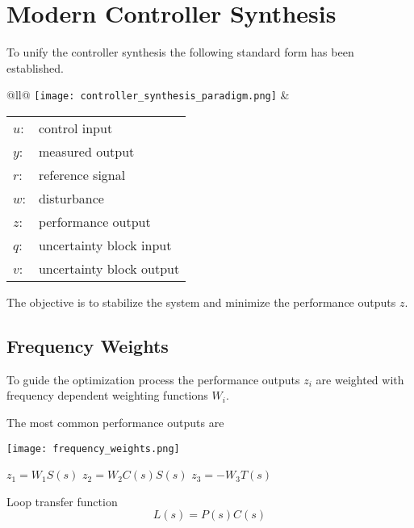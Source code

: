 \section{Modern Controller Synthesis}
To unify the controller synthesis the following standard form has been established.


\setlength{\oldtabcolsep}{\tabcolsep}\setlength\tabcolsep{2pt}

\begin{tabularx}{\linewidth}{@{}ll@{}}
    \texttt{[image: controller\_synthesis\_paradigm.png]}
     &
    {\begin{tabularx}{\linewidth}{@{}ll@{}}
                 $u$: & control input            \\
                 $y$: & measured output          \\
                 $r$: & reference signal         \\
                 $w$: & disturbance              \\
                 $z$: & performance output       \\
                 $q$: & uncertainty block input  \\
                 $v$: & uncertainty block output
             \end{tabularx}
        }
\end{tabularx}

\setlength{\tabcolsep}{\oldtabcolsep}


\newpar{}
The objective is to stabilize the system and minimize the performance outputs $z$.

\subsection{Frequency Weights}

To guide the optimization process the performance outputs $z_i$ are weighted with frequency dependent weighting functions $W_i$.

The most common performance outputs are
\begin{center}
    \texttt{[image: frequency\_weights.png]}
\end{center}

 $z_1=W_1 S(s)$
 $z_2=W_2 C(s) S(s)$
 $z_3=-W_3 T(s)$

\ptitle{}%
Loop transfer function
\begin{equation*}
    L(s)=P(s)C(s)
\end{equation*}

